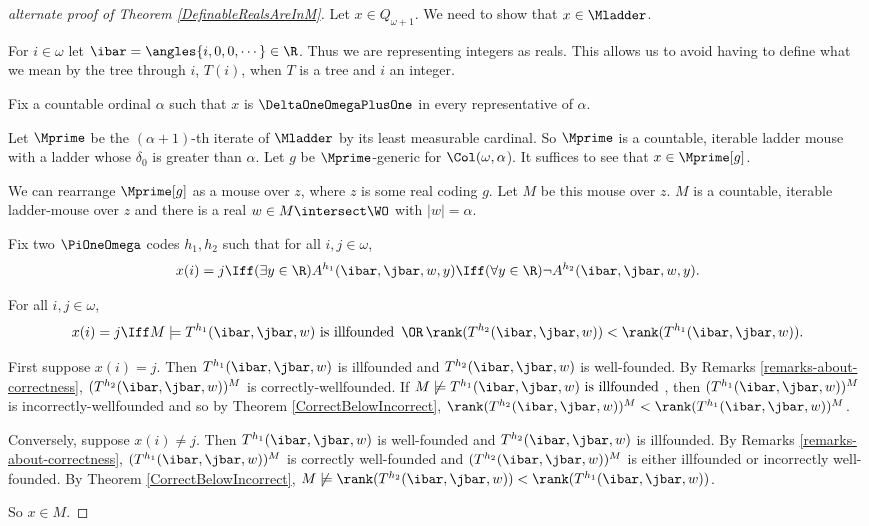 \documentclass[oneside,12pt]{amsart}
\begin{document}
\begin{proof}[alternate proof of Theorem \ref{DefinableRealsAreInM}]
Let $x\in Q_{\omega+1}$. We need to show that $x\in\Mladder$.

For $i\in\omega$ let $\ibar=\angles{i,0,0,\cdots}\in\R$. Thus we are representing integers as reals.
This allows us to avoid having to define what we mean by the tree through $i$, $T(i)$, when $T$ is a tree and $i$ an integer.


Fix a countable ordinal $\alpha$ such that $x$ is $\DeltaOneOmegaPlusOne$ in every representative
of $\alpha$.

Let $\Mprime$ be the $(\alpha+1)$-th iterate of $\Mladder$ by its least
measurable cardinal. So $\Mprime$ is a countable, iterable ladder mouse with
a ladder whose $\delta_0$ is greater than $\alpha$. Let $g$ be $\Mprime$-generic
for $\Col(\omega,\alpha$). It suffices to see that $x\in\Mprime[g]$.

We can rearrange $\Mprime[g]$ as a mouse over $z$, where $z$ is some real coding $g$.
Let $M$ be this mouse over $z$. $M$ is a countable, iterable ladder-mouse over $z$ and there
is a real $w\in M\intersect\WO$ with $|w|=\alpha$.

Fix two $\PiOneOmega$ codes $h_1,h_2$ such that for all $i,j\in\omega$,
$$x(i)=j \Iff (\exists y\in\R)A^{h_1}(\ibar,\jbar,w,y) \Iff (\forall y\in\R)\neg A^{h_2}(\ibar,\jbar,w,y).$$

\begin{claim}
For all $i,j\in\omega$,
$$x(i)=j \Iff  M \models T^{h_1}(\ibar,\jbar,w) \text{ is illfounded } \,\OR\, \rank(T^{h_2}(\ibar,\jbar,w)) < \rank(T^{h_1}(\ibar,\jbar,w)).$$
\end{claim}
\begin{subproof}
First suppose $x(i)=j$. Then $T^{h_1}(\ibar,\jbar,w)$ is illfounded and 
$T^{h_2}(\ibar,\jbar,w)$ is well-founded. By
Remarks \ref{remarks-about-correctness}, $(T^{h_2}(\ibar,\jbar,w))^M$
is correctly-wellfounded. If $M \not\models T^{h_1}(\ibar,\jbar,w) \text{ is illfounded }$, then $(T^{h_1}(\ibar,\jbar,w))^M$ is incorrectly-wellfounded
and so by Theorem 
\ref{CorrectBelowIncorrect}, 
$\rank(T^{h_2}(\ibar,\jbar,w))^M < \rank(T^{h_1}(\ibar,\jbar,w))^M$.

Conversely, suppose $x(i)\not=j$. Then $T^{h_1}(\ibar,\jbar,w)$ is well-founded and 
$T^{h_2}(\ibar,\jbar,w)$ is illfounded. By Remarks \ref{remarks-about-correctness},
$(T^{h_1}(\ibar,\jbar,w))^M$ is correctly well-founded and 
$(T^{h_2}(\ibar,\jbar,w))^M$ is either illfounded or incorrectly well-founded.
By Theorem \ref{CorrectBelowIncorrect}, 
$M\not\models \rank(T^{h_2}(\ibar,\jbar,w)) < \rank(T^{h_1}(\ibar,\jbar,w))$.
\end{subproof}

So $x\in M$.

\end{proof}
\end{document}
